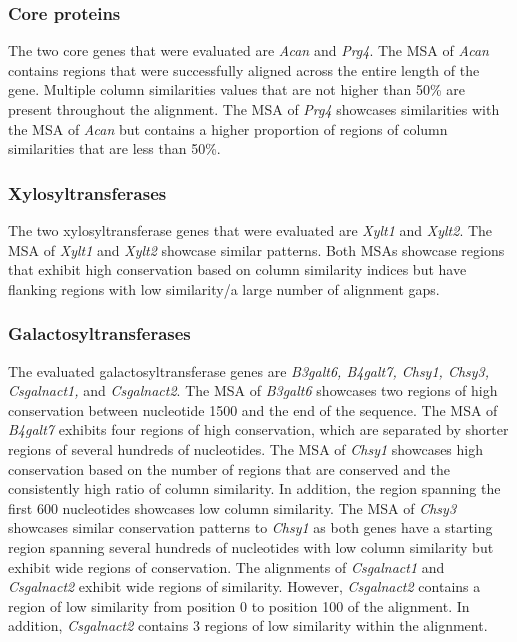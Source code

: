 \documentclass{article}
\begin{document}
\subsubsection{Core proteins}
The two core genes that were evaluated are \textit{Acan} and \textit{Prg4}. The MSA of \textit{Acan} contains regions that were successfully aligned across the entire length of the gene. Multiple column similarities values that are not higher than 50\% are present throughout the alignment. The MSA of \textit{Prg4} showcases similarities with the MSA of \textit{Acan} but contains a higher proportion of regions of column similarities that are less than 50\%.

\subsubsection{Xylosyltransferases}
The two xylosyltransferase genes that were evaluated are \textit{Xylt1} and \textit{Xylt2}. The MSA of \textit{Xylt1} and \textit{Xylt2} showcase similar patterns. Both MSAs showcase regions that exhibit high conservation based on column similarity indices but have flanking regions with low similarity/a large number of alignment gaps.

\subsubsection{Galactosyltransferases}
The evaluated galactosyltransferase genes are \textit{B3galt6, B4galt7, Chsy1, Chsy3, Csgalnact1,} and \textit{Csgalnact2}. The MSA of \textit{B3galt6} showcases two regions of high conservation between nucleotide 1500 and the end of the sequence. The MSA of \textit{B4galt7} exhibits four regions of high conservation, which are separated by shorter regions of several hundreds of nucleotides. The MSA of \textit{Chsy1} showcases high conservation based on the number of regions that are conserved and the consistently high ratio of column similarity. In addition, the region spanning the first 600 nucleotides showcases low column similarity. The MSA of \textit{Chsy3} showcases similar conservation patterns to \textit{Chsy1} as both genes have a starting region spanning several hundreds of nucleotides with low column similarity but exhibit wide regions of conservation. The alignments of \textit{Csgalnact1} and \textit{Csgalnact2} exhibit wide regions of similarity. However, \textit{Csgalnact2} contains a region of low similarity from position 0 to position 100 of the alignment. In addition, \textit{Csgalnact2} contains 3 regions of low similarity within the alignment. 
\end{document}
